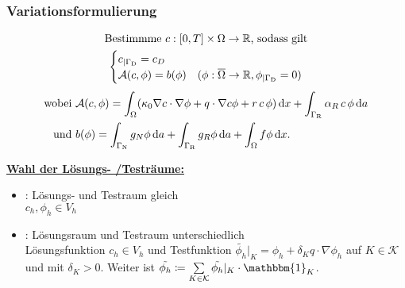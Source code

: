 
\subsubsection{Variationsformulierung}
\begin{gather*}
	\text{Bestimmme } c:[0,T] \times \Omega \to \mathbb{R} \text{, sodass gilt}\\
	\begin{cases}
		c_{|\Gamma_{\text{D}}} = c_D &\\
		\mathcal{A}(c,\phi) = b(\phi) &(\phi: \overline{\Omega} \to \mathbb{R}, \phi_{|\Gamma_{\text{D}}} = 0)
	\end{cases}
\end{gather*}
\begin{align*}
	\text{wobei } &\mathcal{A}(c,\phi) = \int_\Omega (\kappa_0 \nabla c \cdot \nabla \phi + q \cdot \nabla c \phi + r \, c \, \phi) \mathop{}\!\mathrm{d} x + \int_{\Gamma_{\text{R}}} \alpha_R \, c \,\phi \mathop{}\!\mathrm{d} a\\
	\text{und } &b(\phi) = \int_{\Gamma_{\text{N}}} g_N \phi \mathop{}\!\mathrm{d} a + \int_{\Gamma_{\text{R}}} g_R \phi \mathop{}\!\mathrm{d} a + \int_\Omega f \phi \mathop{}\!\mathrm{d} x.
\end{align*}

\underline{\textbf{Wahl der Lösungs- /Testräume:}}
\begin{itemize}
	\item {}: Lösungs- und Testraum gleich\\ $ c_h, \phi_h \in V_h$
	\item {}: Lösungsraum und Testraum unterschiedlich\\ Lösungsfunktion $ c_h \in V_h $ und Testfunktion $\tilde{\phi_h}|_K  = \phi_h + \delta_K q \cdot \nabla \phi_h $ auf $ K \in \mathcal{K} $ und mit $ \delta_K > 0 $. Weiter ist $\tilde{\phi_h} \coloneqq \sum\limits_{K \in \mathcal{K}} \tilde{\phi_h}|_K \cdot \mathbbm{1}_K$.
\end{itemize}

